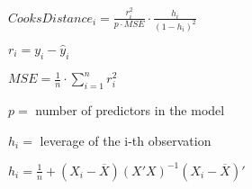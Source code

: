 \documentclass[12pt]{article}
\begin{document}
$CooksDistance_{i} = \frac{r_{i}^{2}}{p \cdot MSE} \cdot \frac{h_{i}}{(1 - h_{i})^{2}}$ 

$r_{i} = y_{i} - \hat{y}_{i}$

$MSE = \frac{1}{n} \cdot \sum_{i=1}^{n} r_{i}^{2}$

$p =$ number of predictors in the model

$h_{i} =$ leverage of the i-th observation

$h_{i} = \frac{1}{n} + (X_{i} - \overline{X})(X'X)^{-1}(X_{i}-\overline{X})'$
\end{document}
